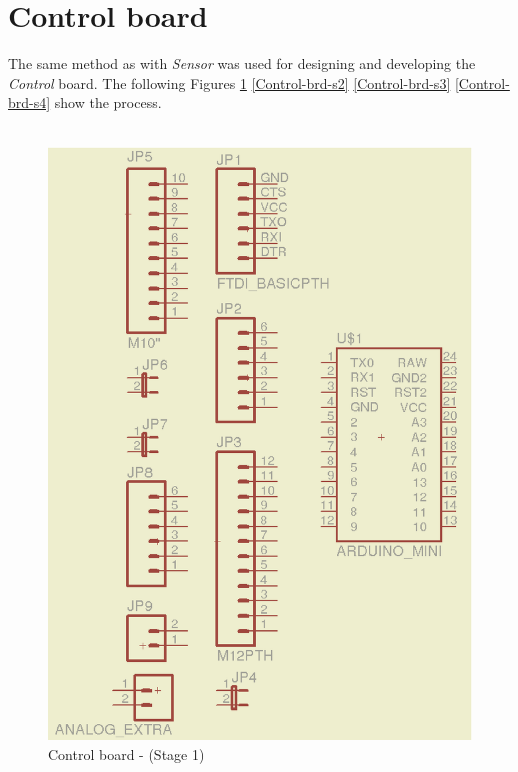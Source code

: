 \documentclass[12pt,a4paper]{report}
\begin{document}
\section{Control board}
The same method as with \textit{Sensor} was used for designing and developing the \textit{Control} board. The following Figures \ref{Control-brd-s1} \ref{Control-brd-s2} \ref{Control-brd-s3} \ref{Control-brd-s4} show the process. \\
\ \\
\begin{figure}[H]
\centering
\includegraphics*[scale=0.25]{control_brd_s1}
\caption{Control board -  (Stage 1)}
\label{Control-brd-s1}
\end{figure}
\ \\
\end{document}
